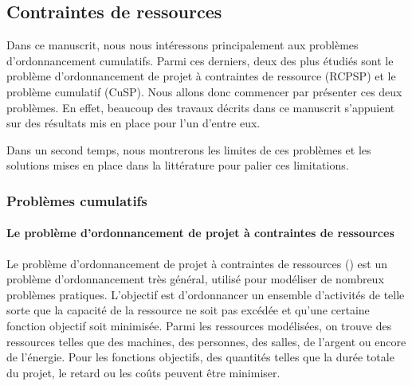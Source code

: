 
\subsection{Contraintes de ressources}
\label{sec:ordo_res}
Dans ce manuscrit, nous nous intéressons  principalement  aux problèmes
d'ordonnancement cumulatifs. Parmi ces derniers, deux des plus
étudiés sont le problème d'ordonnancement de projet à contraintes de
ressource (RCPSP) et le problème cumulatif (CuSP). Nous allons donc
commencer par présenter ces deux problèmes. En effet, beaucoup des
travaux décrits dans ce manuscrit s'appuient sur des résultats mis en
place pour l'un d'entre eux. 

Dans un second temps, nous montrerons les limites de ces problèmes et
les solutions mises en place dans la littérature pour palier ces
limitations.

\subsubsection{Problèmes cumulatifs}
\paragraph{Le problème d'ordonnancement  de projet à contraintes de
  ressources}
\index{\RCPSPidx}
Le problème d'ordonnancement de projet à contraintes de ressources
(\RCPSP) est un problème d'ordonnancement très général, utilisé pour
modéliser de nombreux problèmes pratiques. L'objectif est
d'ordonnancer un ensemble d'activités de telle sorte que la capacité
de la ressource ne soit pas excédée et qu'une certaine fonction
objectif soit minimisée. Parmi les ressources modélisées, on trouve
des ressources telles que des machines, des personnes, des salles, de
l'argent ou encore de l'énergie. Pour les fonctions objectifs, des
quantités telles que la durée totale du projet, le retard ou les coûts
peuvent être minimiser.

